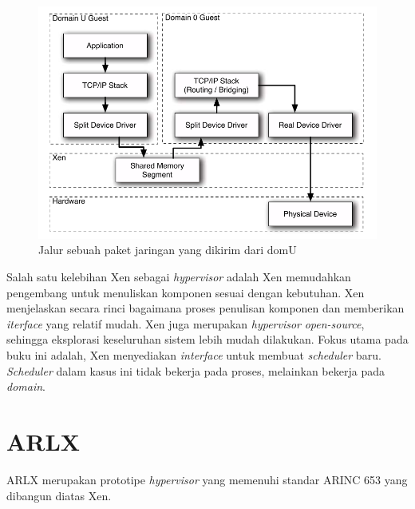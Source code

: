\begin{figure}[htbp]
    \includegraphics[scale=0.5]{./resources/xen-split-driver.png}
    \caption{Jalur sebuah paket jaringan yang dikirim dari domU \citep{Chisnall2014}}
    \label{figure:xen_split_driver}
\end{figure}

Salah satu kelebihan Xen sebagai \textit{hypervisor} adalah Xen memudahkan pengembang untuk menuliskan komponen sesuai dengan kebutuhan.
Xen menjelaskan secara rinci bagaimana proses penulisan komponen dan memberikan \textit{iterface} yang relatif mudah.
Xen juga merupakan \textit{hypervisor} \textit{open-source}, sehingga eksplorasi keseluruhan sistem lebih mudah dilakukan.
Fokus utama pada buku ini adalah, Xen menyediakan \textit{interface} untuk membuat \textit{scheduler} baru.
\textit{Scheduler} dalam kasus ini tidak bekerja pada proses, melainkan bekerja pada \textit{domain}.

\section{ARLX}

ARLX merupakan prototipe \textit{hypervisor} yang memenuhi standar ARINC 653 yang dibangun diatas Xen.

